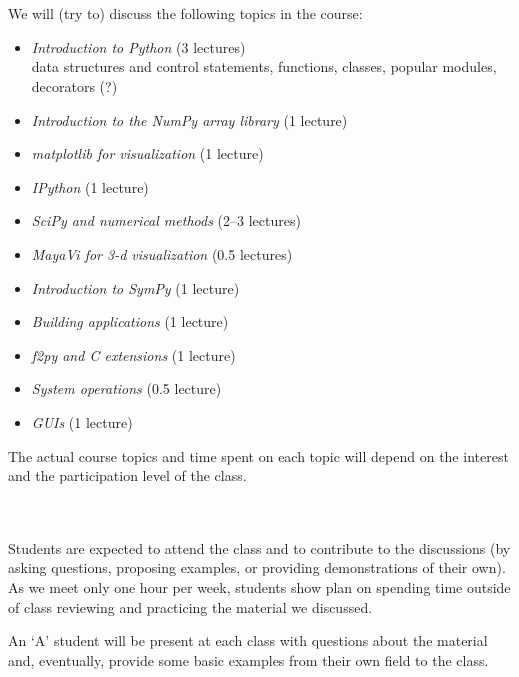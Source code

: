 \documentclass[11pt]{article}
\begin{document}
\ \\
 \\
We will (try to) discuss the following topics in the course:
\begin{itemize}
\item {\em Introduction to Python} (3 lectures) \\
     data structures and control statements, functions, classes, popular modules,
     decorators (?)

\item {\em Introduction to the NumPy array library} (1 lecture)

\item {\em matplotlib for visualization} (1 lecture)

\item {\em IPython} (1 lecture)

\item {\em SciPy and numerical methods} (2--3 lectures)

\item {\em MayaVi for 3-d visualization} (0.5 lectures)

\item {\em Introduction to SymPy} (1 lecture)

\item {\em Building applications} (1 lecture)

\item {\em f2py and C extensions} (1 lecture)

\item {\em System operations} (0.5 lecture)

\item {\em GUIs} (1 lecture)

\end{itemize}

\noindent The actual course topics and time spent on each topic will depend on the
interest and the participation level of the class.

\ \\
 \\
Students are expected to attend the class and to contribute
to the discussions (by asking questions, proposing examples, or
providing demonstrations of their own).  As we meet only one hour per
week, students show plan on spending time outside of class reviewing
and practicing the material we discussed. 

An `A' student will be present at each class with questions about the 
material and, eventually, provide some basic examples from their own field
to the class.
\end{document}
